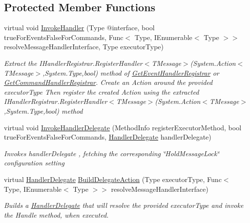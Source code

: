 \subsection*{Protected Member Functions}
\begin{DoxyCompactItemize}
\item 
virtual void \hyperlink{classCqrs_1_1Configuration_1_1BusRegistrar_a159eba5ece9015165be70676a52d8127_a159eba5ece9015165be70676a52d8127}{Invoke\+Handler} (Type @interface, bool true\+For\+Events\+False\+For\+Commands, Func$<$ Type, I\+Enumerable$<$ Type $>$$>$ resolve\+Message\+Handler\+Interface, Type executor\+Type)
\begin{DoxyCompactList}\small\item\em Extract the I\+Handler\+Registrar.\+Register\+Handler$<$\+T\+Message$>$(\+System.\+Action$<$\+T\+Message$>$,\+System.\+Type,bool) method of \hyperlink{classCqrs_1_1Configuration_1_1BusRegistrar_adaab0236b3ce39214ce60b2272e5ab19_adaab0236b3ce39214ce60b2272e5ab19}{Get\+Event\+Handler\+Registrar} or \hyperlink{classCqrs_1_1Configuration_1_1BusRegistrar_a5ac56d73af9d550c70ee722daed7dce8_a5ac56d73af9d550c70ee722daed7dce8}{Get\+Command\+Handler\+Registrar}. Create an Action around the provided {\itshape executor\+Type}  Then register the created Action using the extracted I\+Handler\+Registrar.\+Register\+Handler$<$\+T\+Message$>$(\+System.\+Action$<$\+T\+Message$>$,\+System.\+Type,bool) method \end{DoxyCompactList}\item 
virtual void \hyperlink{classCqrs_1_1Configuration_1_1BusRegistrar_a3103da4cf077104607fe03a862958827_a3103da4cf077104607fe03a862958827}{Invoke\+Handler\+Delegate} (Method\+Info register\+Executor\+Method, bool true\+For\+Events\+False\+For\+Commands, \hyperlink{classCqrs_1_1Configuration_1_1HandlerDelegate}{Handler\+Delegate} handler\+Delegate)
\begin{DoxyCompactList}\small\item\em Invokes {\itshape handler\+Delegate} , fetching the corresponding \char`\"{}\+Hold\+Message\+Lock\char`\"{} configuration setting \end{DoxyCompactList}\item 
virtual \hyperlink{classCqrs_1_1Configuration_1_1HandlerDelegate}{Handler\+Delegate} \hyperlink{classCqrs_1_1Configuration_1_1BusRegistrar_a07d27088739f2ae0ac7c551fc6a72ac9_a07d27088739f2ae0ac7c551fc6a72ac9}{Build\+Delegate\+Action} (Type executor\+Type, Func$<$ Type, I\+Enumerable$<$ Type $>$$>$ resolve\+Message\+Handler\+Interface)
\begin{DoxyCompactList}\small\item\em Builds a \hyperlink{classCqrs_1_1Configuration_1_1HandlerDelegate}{Handler\+Delegate} that will resolve the provided {\itshape executor\+Type}  and invoke the Handle method, when executed. \end{DoxyCompactList}\item 

\end{DoxyCompactItemize}
